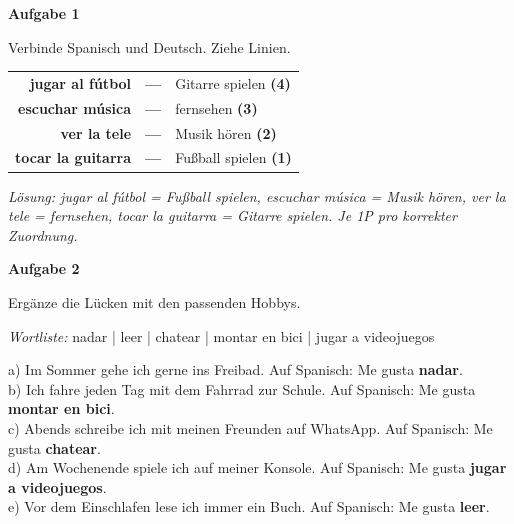 \documentclass[11pt, a4paper]{article}
\newcommand{\fachfarbe}{spanisch}
\newcommand{\punktebox}[1]{\hfill\fbox{\small \_/#1}}
\newcommand{\loesung}[1]{\textcolor{loesung}{\textbf{#1}}}
\newenvironment{aufgabe}[1]{%
    \needspace{5\baselineskip}%
    \nopagebreak[4]%
    \vspace{10pt}
    \noindent\textbf{\textcolor{\fachfarbe}{Aufgabe #1}}
    \nopagebreak[4]%
    \vspace{5pt}
    \nopagebreak[4]%
    \begin{list}{}{\leftmargin=0pt}
    \item[]
}{%
    \end{list}
}
\newcommand{\es}[1]{\textcolor{\fachfarbe}{\textbf{#1}}}
\begin{document}
\vspace{10pt}


\begin{aufgabe}{1}
Verbinde Spanisch und Deutsch. Ziehe Linien. \punktebox{4}
\end{aufgabe}

\begin{center}
\begin{tabular}{rcl}
\es{jugar al fútbol} & \loesung{---} & Gitarre spielen \loesung{(4)} \\[0.8em]
\es{escuchar música} & \loesung{---} & fernsehen \loesung{(3)} \\[0.8em]
\es{ver la tele} & \loesung{---} & Musik hören \loesung{(2)} \\[0.8em]
\es{tocar la guitarra} & \loesung{---} & Fußball spielen \loesung{(1)} \\
\end{tabular}
\end{center}

\vspace{0.5em}
\textit{\textcolor{grau}{Lösung: jugar al fútbol = Fußball spielen, escuchar música = Musik hören, ver la tele = fernsehen, tocar la guitarra = Gitarre spielen. Je 1P pro korrekter Zuordnung.}}

\vspace{15pt}


\begin{aufgabe}{2}
Ergänze die Lücken mit den passenden Hobbys. \punktebox{5}
\end{aufgabe}

\begin{vokabelkasten}
\textit{Wortliste:} nadar | leer | chatear | montar en bici | jugar a videojuegos
\end{vokabelkasten}

\vspace{0.5em}

\noindent
a) Im Sommer gehe ich gerne ins Freibad. Auf Spanisch: Me gusta \loesung{nadar}.\\[0.8em]
b) Ich fahre jeden Tag mit dem Fahrrad zur Schule. Auf Spanisch: Me gusta \loesung{montar en bici}.\\[0.8em]
c) Abends schreibe ich mit meinen Freunden auf WhatsApp. Auf Spanisch: Me gusta \loesung{chatear}.\\[0.8em]
d) Am Wochenende spiele ich auf meiner Konsole. Auf Spanisch: Me gusta \loesung{jugar a videojuegos}.\\[0.8em]
e) Vor dem Einschlafen lese ich immer ein Buch. Auf Spanisch: Me gusta \loesung{leer}.\\
\end{document}

